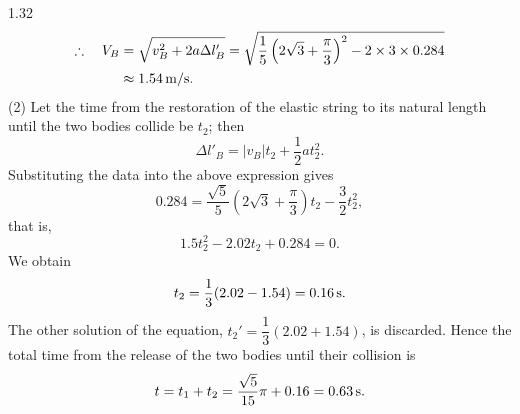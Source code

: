 \begin{solution}{1.32}
\[\]
\begin{align*}
\therefore\quad V_B&=\sqrt{v_B^2+2a\Delta l'_B}=\sqrt{\frac{1}{5}\left(2\sqrt{3}+\frac{\pi}{3}\right)^2-2\times 3\times 0.284}\\
&\approx 1.54\,\mathrm{m/s}.
\end{align*}
(2) Let the time from the restoration of the elastic string to its natural length until the two bodies collide be $t_2$; then
\[
\Delta l'_B=|v_B|t_2+\frac{1}{2}at_2^2.
\]
Substituting the data into the above expression gives
\[
0.284=\frac{\sqrt{5}}{5}\left(2\sqrt{3}+\frac{\pi}{3}\right)t_2-\frac{3}{2}t_2^2,
\]
that is,
\[
1.5t_2^2-2.02t_2+0.284=0.
\]
We obtain
\[
t_2=\frac{1}{3}(2.02-1.54)=0.16\,\mathrm{s}.
\]
The other solution of the equation, $t_2'=\dfrac{1}{3}(2.02+1.54)$, is discarded. Hence the total time from the release of the two bodies until their collision is
\[
t=t_1+t_2=\frac{\sqrt{5}}{15}\pi+0.16=0.63\,\mathrm{s}.
\]
\end{solution}

